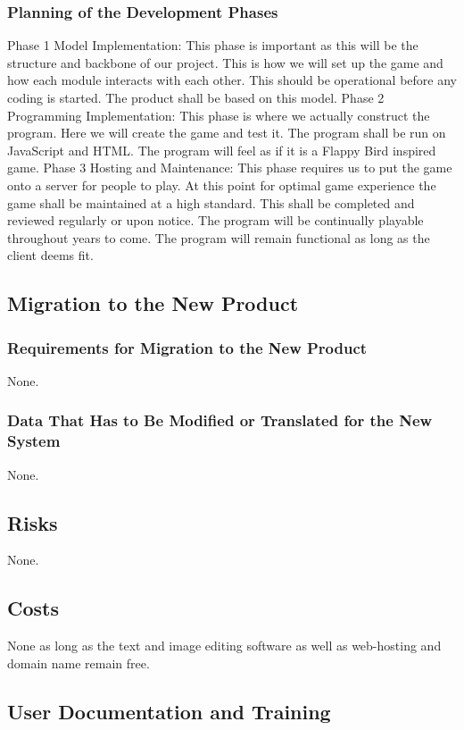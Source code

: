 \documentclass[11pt, oneside]{article}   	%
\begin{document}
\subsubsection*{Planning of the Development Phases}
Phase 1 Model Implementation:
This phase is important as this will be the structure and backbone of our project. This is how we will set up the game and how each module interacts with each other. This should be operational before any coding is started. The product shall be based on this model.
Phase 2 Programming Implementation:
This phase is where we actually construct the program. Here we will create the game and test it. The program shall be run on JavaScript and HTML. The program will feel as if it is a Flappy Bird inspired game.
Phase 3 Hosting and Maintenance:
This phase requires us to put the game onto a server for people to play. At this point for optimal game experience the game shall be maintained at a high standard. This shall be completed and reviewed regularly or upon notice. The program will be continually playable throughout years to come. The program will remain functional as long as the client deems fit.


\subsection*{Migration to the New Product}
\subsubsection*{Requirements for Migration to the New Product}
None.


\subsubsection*{Data That Has to Be Modified or Translated for the New System}
None.


\subsection*{Risks}
None.


\subsection*{Costs}
None as long as the text and image editing software as well as web-hosting and domain name remain free.


\subsection*{User Documentation and Training}
\end{document}
